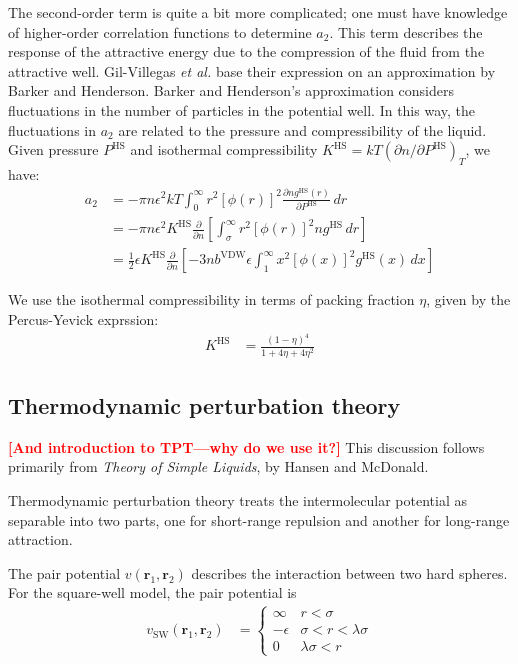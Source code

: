 \documentclass[letterpaper,twocolumn,amsmath,amssymb,prb]{revtex4-1}
\newcommand{\1}{\ensuremath{\textbf{r}_1}}
\newcommand{\2}{\ensuremath{\textbf{r}_2}}
\newcommand{\fixme}[1]{\textcolor{red}{\textbf{[#1]}}}
\begin{document}
The second-order term is quite a bit more complicated; one must have knowledge of higher-order correlation functions to determine $a_2$. This term describes the response of the attractive energy due to the compression of the fluid from the attractive well. Gil-Villegas \emph{et al.} base their expression on an approximation by Barker and Henderson.\cite{Barker67} Barker and Henderson's approximation considers fluctuations in the number of particles in the potential well. In this way, the fluctuations in $a_2$ are related to the pressure and compressibility of the liquid. Given pressure $P^\text{HS}$ and isothermal compressibility $K^\text{HS} = kT\left(\partial n  /\partial P^\text{HS}\right)_T$, we have:
\begin{align}
  a_2 &= -\pi n \epsilon^2kT\int_0^\infty r^2\left[\phi(r)\right]^2\frac{\partial n  g^\text{HS}(r)}{\partial P^\text{HS}}\,dr \\
  &= -\pi n \epsilon^2K^\text{HS}\frac{\partial}{\partial n }\left[\int_\sigma^\infty r^2\left[\phi(r)\right]^2 n  g^\text{HS}\,dr\right] \\
  &= \frac{1}{2}\epsilon K^\text{HS}\frac{\partial}{\partial n }\left[-3 n  b^\text{VDW}\epsilon\int_1^\infty x^2\left[\phi(x)\right]^2 g^\text{HS}(x)\,dx \right]
\end{align}

We use the isothermal compressibility in terms of packing fraction $\eta$, given by the Percus-Yevick exprssion:\cite{Barker76}
\begin{align}
  K^\text{HS} &= \frac{\left(1 - \eta\right)^4}{1 + 4\eta + 4\eta^2}
\end{align}

\subsection{Thermodynamic perturbation theory}\label{subsec:TPT}


\fixme{And introduction to TPT---why do we use it?}
This discussion follows primarily from \textit{Theory of Simple Liquids}, by Hansen and McDonald\cite{Hansen06}.

Thermodynamic perturbation theory treats the intermolecular potential as separable into two parts, one for short-range repulsion and another for long-range attraction.

The pair potential $v(\1,\2)$ describes the interaction between two hard spheres. For the square-well model, the pair potential is
\begin{align}
  v_\text{SW}(\1,\2) &=
    \begin{cases}
      \infty & r < \sigma \\
      -\epsilon & \sigma < r < \lambda\sigma \\
      0 & \lambda\sigma < r
    \end{cases}
\end{align}
\end{document}

